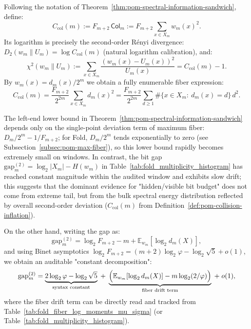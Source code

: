 \begin{definition}\label{def:pom-collision-inflation}
Following the notation of Theorem~\ref{thm:pom-spectral-information-sandwich}, define:
\[
C_{\mathrm{col}}(m)
:=F_{m+2}\,\mathsf{Col}_m
:=F_{m+2}\sum_{x\in X_m} w_m(x)^2.
\]
Its logarithm is precisely the second-order Rényi divergence:
\(
D_2(w_m\|U_m)=\log C_{\mathrm{col}}(m)
\)
(natural logarithm calibration), and:
\[
\chi^2(w_m\|U_m)
:=\sum_{x\in X_m}\frac{(w_m(x)-U_m(x))^2}{U_m(x)}
=C_{\mathrm{col}}(m)-1.
\]
By $w_m(x)=d_m(x)/2^m$ we obtain a fully enumerable fiber expression:
\[
C_{\mathrm{col}}(m)
=\frac{F_{m+2}}{2^{2m}}\sum_{x\in X_m} d_m(x)^2
=\frac{F_{m+2}}{2^{2m}}\sum_{d\ge 1}\#\{x\in X_m:\ d_m(x)=d\}\,d^2.
\]
\end{definition}

\begin{remark}\label{rem:pom-gap-bulk-vs-tail}
The left-end lower bound in Theorem~\ref{thm:pom-spectral-information-sandwich} depends only on the single-point deviation term of maximum fiber:
\(
D_m/2^m-1/F_{m+2}
\);
for Fold, $D_m/2^m$ tends exponentially to zero (see Subsection~\ref{subsec:pom-max-fiber}), so this lower bound rapidly becomes extremely small on windows.
In contrast, the bit gap $\mathrm{gap}_m^{(2)}=\log_2|X_m|-H(w_m)$ in Table~\ref{tab:fold_multiplicity_histogram} has reached constant magnitude within the audited window and exhibits slow drift;
this suggests that the dominant evidence for "hidden/visible bit budget" does not come from extreme tail, but from the bulk spectral energy distribution reflected by overall second-order deviation ($C_{\mathrm{col}}(m)$ from Definition~\ref{def:pom-collision-inflation}).
\par
On the other hand, writing the gap as:
\[
\mathrm{gap}_m^{(2)}
=\log_2 F_{m+2}-m+\mathbb{E}_{w_m}[\log_2 d_m(X)],
\]
and using Binet asymptotics $\log_2 F_{m+2}=(m+2)\log_2\varphi-\log_2\sqrt5+o(1)$, we obtain an auditable "constant decomposition":
\[
\mathrm{gap}_m^{(2)}
=\underbrace{2\log_2\varphi-\log_2\sqrt5}_{\text{syntax constant}}
\;+\;
\underbrace{\Bigl(\mathbb{E}_{w_m}[\log_2 d_m(X)]-m\log_2(2/\varphi)\Bigr)}_{\text{fiber drift term}}
\;+\;o(1),
\]
where the fiber drift term can be directly read and tracked from Table~\ref{tab:fold_fiber_log_moments_mu_sigma} (or Table~\ref{tab:fold_multiplicity_histogram}).
\end{remark}

